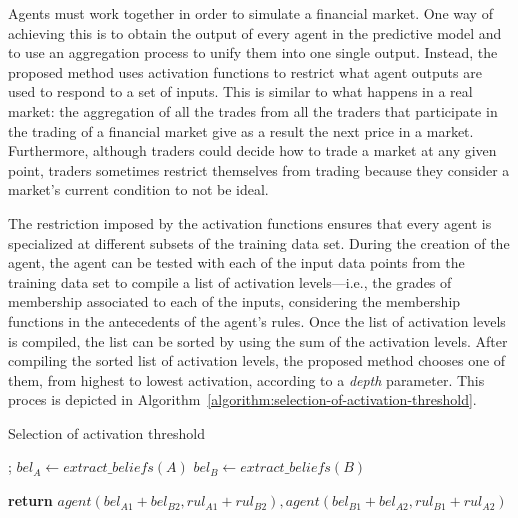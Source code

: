 \documentclass{ieeeaccess}
\begin{document}
Agents must work together in order to simulate a financial market. One
way of achieving this is to obtain the output of every agent in the
predictive model and to use an aggregation process to unify them into
one single output. Instead, the proposed method uses activation
functions to restrict what agent outputs are used to respond to a set
of inputs. This is similar to what happens in a real market: the
aggregation of all the trades from all the traders that participate
in the trading of a financial market give as a result the next price
in a market. Furthermore, although traders could decide how to trade a
market at any given point, traders sometimes restrict themselves from
trading because they consider a market's current condition to not be
ideal.

The restriction imposed by the activation functions ensures that every
agent is specialized at different subsets of the training data
set. During the creation of the agent, the agent can be tested with
each of the input data points from the training data set to compile a
list of activation levels---i.e., the grades of membership associated
to each of the inputs, considering the membership functions in the
antecedents of the agent's rules. Once the list of activation levels
is compiled, the list can be sorted by using the sum of the activation
levels. After compiling the sorted list of activation levels, the proposed
method chooses one of them, from highest to lowest activation,
according to a \textit{depth} parameter. This proces is depicted in
Algorithm~\ref{algorithm:selection-of-activation-threshold}.

\begin{algorithm}
\caption{Selection of activation threshold}
    \label{algorithm:selection-of-activation-threshold}
\begin{algorithmic}[1]
    ;
    \State $bel_A\gets extract\_beliefs(A)$
    \State $bel_B\gets extract\_beliefs(B)$

    \State \textbf{return} $agent(bel_{A1} + bel_{B2}, rul_{A1} + rul_{B2}),
    agent(bel_{B1} + bel_{A2}, rul_{B1} + rul_{A2})$
    \EndProcedure
\end{algorithmic}
\end{algorithm}

\end{document}

